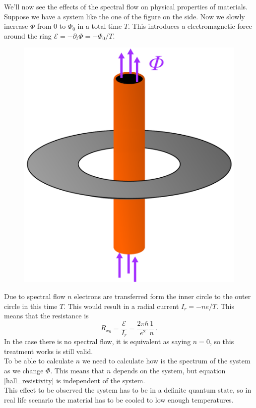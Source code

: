         We'll now see the effects of the spectral flow on physical properties of materials. Suppose we have a system like the one of the figure on the side. Now we slowly increase $\Phi$ from 0 to $\Phi_0$ in a total time $T$. This introduces a electromagnetic force around the ring $\mathcal{E}=-\partial_t\Phi=-\Phi_0/T$.
        \begin{figure}
            \includegraphics[width=.4\textwidth]{Immagini/topo/disk-solenoid.pdf}
        \end{figure} 
        Due to spectral flow $n$ electrons are transferred form the inner circle to the outer circle in this time $T$. This would result in a radial current $I_r=-ne/T$. This means that the resistance is 
        \begin{equation} 
            \label{hall_resistivity}
                R_{xy}=\frac{\mathcal {E}}{I_r}=\frac{2\pi\hbar}{e^2}\frac 1n\,.
        \end{equation}
        In the case there is no spectral flow, it is equivalent as saying $n=0$, so this treatment works is still valid.\\
        To be able to calculate $n$ we need to calculate how is the spectrum of the system as we change $\Phi$. This means that $n$ depends on the system, but equation \ref{hall_resistivity} is independent of the system.\\
        This effect to be observed the system has to be in a definite quantum state, so in real life scenario the material has to be cooled to low enough temperatures.